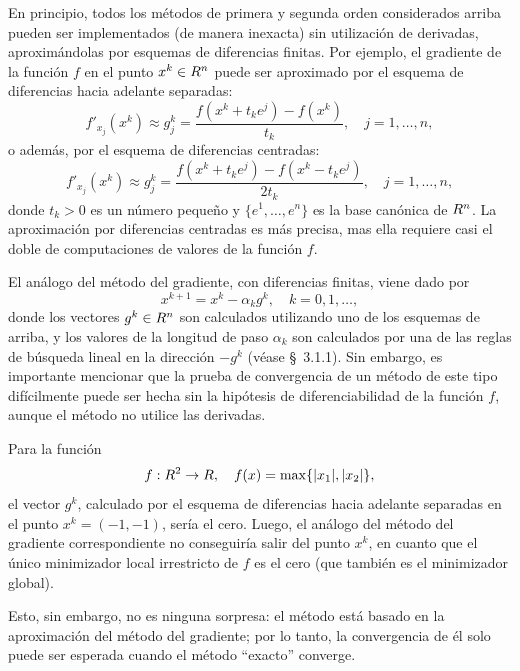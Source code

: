 En principio, todos los métodos de primera y segunda orden considerados arriba pueden ser implementados (de manera inexacta) sin utilización de derivadas, aproximándolas por esquemas de diferencias finitas. Por ejemplo, el gradiente de la función $f$ en el punto $x^k \in R^n$ puede ser aproximado por el esquema de diferencias hacia adelante separadas:
\[
    f'_{x_j}(x^k) \approx g^k_j = \frac{f(x^k + t_k e^j) - f(x^k)}{t_k}, \quad j = 1, \dots, n,
\]
o además, por el esquema de diferencias centradas:
\[
    f'_{x_j}(x^k) \approx g^k_j = \frac{f(x^k + t_k e^j) - f(x^k - t_k e^j)}{2t_k}, \quad j = 1, \dots, n,
\]
donde $t_k > 0$ es un número pequeño y $\{e^1, \dots, e^n\}$ es la base canónica de $R^n$. La aproximación por diferencias centradas es más precisa, mas ella requiere casi el doble de computaciones de valores de la función $f$.

El análogo del método del gradiente, con diferencias finitas, viene dado por
\begin{equation}
    x^{k+1} = x^k - \alpha_k g^k, \quad k = 0, 1, \dots,
    \label{v2:eq:3.140}
\end{equation}
donde los vectores $g^k \in R^n$ son calculados utilizando uno de los esquemas de arriba, y los valores de la longitud de paso $\alpha_k$ son calculados por una de las reglas de búsqueda lineal en la dirección $-g^k$ (véase \S~3.1.1). Sin embargo, es importante mencionar que la prueba de convergencia de un método de este tipo difícilmente puede ser hecha sin la hipótesis de diferenciabilidad de la función $f$, aunque el método no utilice las derivadas.

\begin{example}\label{v2:exa:3.5.1}
    Para la función
    \[
        f : R^2 \to R, \quad f(x) = \max\{|x_1|, |x_2|\},
    \]
    el vector $g^k$, calculado por el esquema de diferencias hacia adelante separadas en el punto $x^k = (-1, -1)$, sería el cero. Luego, el análogo del método del gradiente correspondiente no conseguiría salir del punto $x^k$, en cuanto que el único minimizador local irrestricto de $f$ es el cero (que también es el minimizador global).
\end{example}

Esto, sin embargo, no es ninguna sorpresa: el método está basado en la aproximación del método del gradiente; por lo tanto, la convergencia de él solo puede ser esperada cuando el método ``exacto'' converge.

